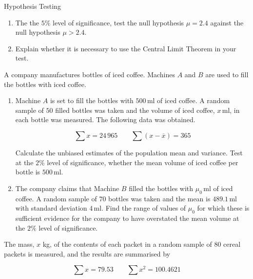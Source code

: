 \documentclass[11pt,a4paper]{book}
\begin{document}
\begin{assignment}{Hypothesis Testing}
\begin{numedquestion}
\begin{enumerate}[label=(\alph*)]
\item  The the $5\%$ level of significance, test the null hypothesis
$\mu=2.4$ against the null hypothesis $\mu>2.4$.

\item  Explain whether it is necessary to use the Central Limit Theorem
in your test.

\end{enumerate}
\end{numedquestion}


\begin{numedquestion}
A company manufactures bottles of iced coffee. Machines $A$ and $B$
are used to fill the bottles with iced coffee.

\begin{enumerate}[label=(\alph*)] 

\item Machine $A$ is set to fill the bottles with $500\,\text{ml}$
of iced coffee. A random sample of $50$ filled bottles was taken
and the volume of iced coffee, $x\,\text{ml}$, in each bottle was
measured. The following data was obtained.

\[
\sum x=24\,965\qquad\sum\left(x-\overline{x}\right)=365
\]

Calculate the unbiased estimates of the population mean and variance.
Test at the $2\%$ level of significance, whether the mean volume
of iced coffee per bottle is $500\,\text{ml}$. 

\item The company claims that Machine $B$ filled the bottles with
$\mu_{0}\,\text{ml}$ of iced coffee. A random sample of $70$ bottles
was taken and the mean is $489.1\,\text{ml}$ with standard deviation
$4\,\text{ml}$. Find the range of values of $\mu_{0}$ for which
these is sufficient evidence for the company to have overstated the
mean volume at the $2\%$ level of significance.

\end{enumerate}
\end{numedquestion}

\begin{numedquestion}
The mass, $x$ kg, of the contents of each packet in a random sample
of $80$ cereal packets is measured, and the results are summarised
by

\[
\sum x=79.53\qquad\sum x^{2}=100.4621
\]

\begin{enumerate}[label=(\alph*)] 


\end{enumerate}
\end{numedquestion}
\end{assignment}
\end{document}
